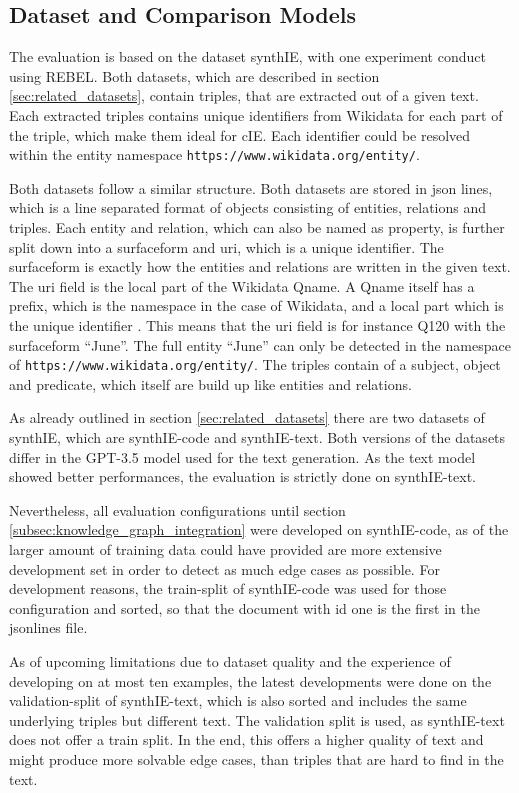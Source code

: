 \documentclass[a4paper,oneside,bibliography=totoc]{scrbook}
\begin{document}
\subsection{Dataset and Comparison Models}
\label{sec:dataset}

The evaluation is based on the dataset synthIE, with one experiment conduct using REBEL. Both datasets, which are described in section \ref{sec:related_datasets}, contain triples, that are extracted out of a given text. Each extracted triples contains unique identifiers from Wikidata for each part of the triple, which make them ideal for \ac{cIE}. Each identifier could be resolved within the entity namespace \texttt{https://www.wikidata.org/entity/}.

Both datasets follow a similar structure. Both datasets are stored in json lines, which is a line separated format of objects consisting of entities, relations and triples. Each entity and relation, which can also be named as property, is further split down into a surfaceform and uri, which is a unique identifier. The surfaceform is exactly how the entities and relations are written in the given text. The uri field is the local part of the Wikidata Qname. A Qname itself has a prefix, which is the namespace in the case of Wikidata, and a local part which is the unique identifier \cite{ASF2010}. This means that the uri field is for instance Q120 with the surfaceform \enquote{June}. The full entity \enquote{June} can only be detected in the namespace of \texttt{https://www.wikidata.org/entity/}. The triples contain of a subject, object and predicate, which itself are build up like entities and relations.

As already outlined in section \ref{sec:related_datasets} there are two datasets of synthIE, which are synthIE-code and synthIE-text. Both versions of the datasets differ in the GPT-3.5 model used for the text generation. As the text model showed better performances, the evaluation is strictly done on synthIE-text.

Nevertheless, all evaluation configurations until section \ref{subsec:knowledge_graph_integration} were developed on synthIE-code, as of the larger amount of training data could have provided are more extensive development set in order to detect as much edge cases as possible. For development reasons, the train-split of synthIE-code was used for those configuration and sorted, so that the document with id one is the first in the jsonlines file.

As of upcoming limitations due to dataset quality and the experience of developing on at most ten examples, the latest developments were done on the validation-split of synthIE-text, which is also sorted and includes the same underlying triples but different text. The validation split is used, as synthIE-text does not offer a train split. In the end, this offers a higher quality of text and might produce more solvable edge cases, than triples that are hard to find in the text.
\end{document}
